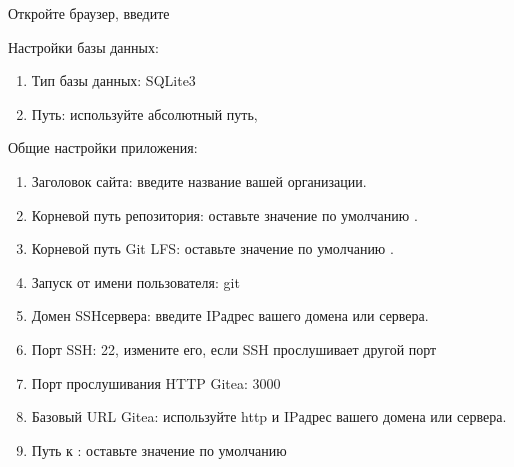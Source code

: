 \documentclass[letterpaper,10pt,russian]{sphinxmanual}
\begin{document}
\sphinxAtStartPar
Откройте браузер, введите 

\sphinxAtStartPar
Настройки базы данных:
\begin{enumerate}
%
\item {} 
\sphinxAtStartPar
Тип базы данных: SQLite3

\item {} 
\sphinxAtStartPar
Путь: используйте абсолютный путь, 

\end{enumerate}

\sphinxAtStartPar
Общие настройки приложения:
\begin{enumerate}
%
\item {} 
\sphinxAtStartPar
Заголовок сайта: введите название вашей организации.

\item {} 
\sphinxAtStartPar
Корневой путь репозитория: оставьте значение по умолчанию  .

\item {} 
\sphinxAtStartPar
Корневой путь Git LFS: оставьте значение по умолчанию  .

\item {} 
\sphinxAtStartPar
Запуск от имени пользователя: git

\item {} 
\sphinxAtStartPar
Домен SSH\sphinxhyphen{}сервера: введите IP\sphinxhyphen{}адрес вашего домена или сервера.

\item {} 
\sphinxAtStartPar
Порт SSH: 22, измените его, если SSH прослушивает другой порт

\item {} 
\sphinxAtStartPar
Порт прослушивания HTTP Gitea: 3000

\item {} 
\sphinxAtStartPar
Базовый URL Gitea: используйте http и IP\sphinxhyphen{}адрес вашего домена или сервера.

\item {} 
\sphinxAtStartPar
Путь к  : оставьте значение по умолчанию 

\end{enumerate}
\end{document}
